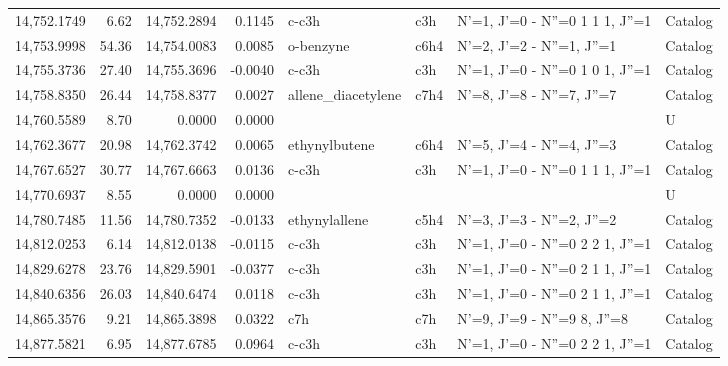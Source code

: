 \begin{longtable}{rrrrllll}
14,752.1749 &      6.62 &       14,752.2894 &    0.1145 &                       c-c3h &     c3h &      N'=1, J'=0 - N''=0 1 1 1, J''=1 &    Catalog \\
14,753.9998 &     54.36 &       14,754.0083 &    0.0085 &                   o-benzyne &    c6h4 &            N'=2, J'=2 - N''=1, J''=1 &    Catalog \\
14,755.3736 &     27.40 &       14,755.3696 &   -0.0040 &                       c-c3h &     c3h &      N'=1, J'=0 - N''=0 1 0 1, J''=1 &    Catalog \\
14,758.8350 &     26.44 &       14,758.8377 &    0.0027 &          allene_diacetylene &    c7h4 &            N'=8, J'=8 - N''=7, J''=7 &    Catalog \\
14,760.5589 &      8.70 &            0.0000 &    0.0000 &                             &         &                                      &          U \\
14,762.3677 &     20.98 &       14,762.3742 &    0.0065 &               ethynylbutene &    c6h4 &            N'=5, J'=4 - N''=4, J''=3 &    Catalog \\
14,767.6527 &     30.77 &       14,767.6663 &    0.0136 &                       c-c3h &     c3h &      N'=1, J'=0 - N''=0 1 1 1, J''=1 &    Catalog \\
14,770.6937 &      8.55 &            0.0000 &    0.0000 &                             &         &                                      &          U \\
14,780.7485 &     11.56 &       14,780.7352 &   -0.0133 &               ethynylallene &    c5h4 &            N'=3, J'=3 - N''=2, J''=2 &    Catalog \\
14,812.0253 &      6.14 &       14,812.0138 &   -0.0115 &                       c-c3h &     c3h &      N'=1, J'=0 - N''=0 2 2 1, J''=1 &    Catalog \\
14,829.6278 &     23.76 &       14,829.5901 &   -0.0377 &                       c-c3h &     c3h &      N'=1, J'=0 - N''=0 2 1 1, J''=1 &    Catalog \\
14,840.6356 &     26.03 &       14,840.6474 &    0.0118 &                       c-c3h &     c3h &      N'=1, J'=0 - N''=0 2 1 1, J''=1 &    Catalog \\
14,865.3576 &      9.21 &       14,865.3898 &    0.0322 &                         c7h &     c7h &      N'=9, J'=9 - N''=9     8, J''=8 &    Catalog \\
14,877.5821 &      6.95 &       14,877.6785 &    0.0964 &                       c-c3h &     c3h &      N'=1, J'=0 - N''=0 2 2 1, J''=1 &    Catalog \\

\end{longtable}

